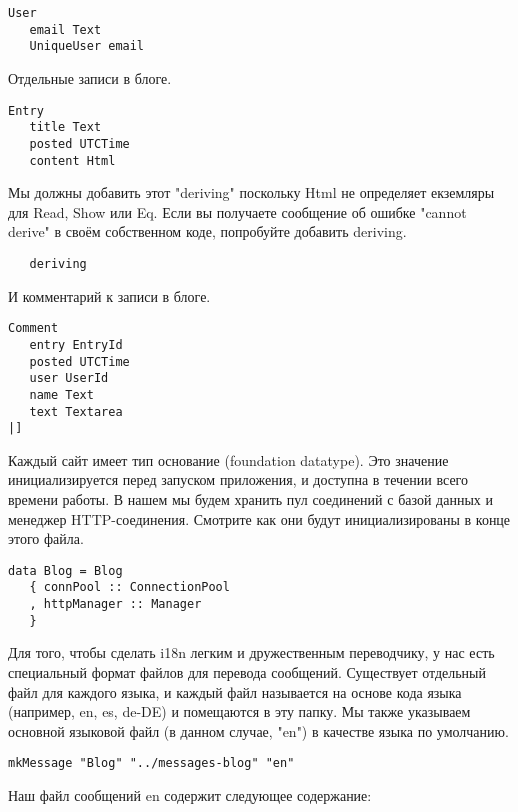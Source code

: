\begin{lstlisting}
User
   email Text
   UniqueUser email
\end{lstlisting}
 
Отдельные записи в блоге. 
 
\begin{lstlisting}
Entry
   title Text
   posted UTCTime
   content Html
\end{lstlisting}
 
Мы должны добавить этот "deriving" поскольку Html не определяет екземляры для Read, Show или Eq. Если вы получаете сообщение об ошибке "cannot derive" в своём собственном коде, попробуйте добавить deriving.
 
\begin{lstlisting}
   deriving
\end{lstlisting}
 
И комментарий к записи в блоге. 
 
\begin{lstlisting}
Comment
   entry EntryId
   posted UTCTime
   user UserId
   name Text
   text Textarea
|]
\end{lstlisting}
 
Каждый сайт имеет тип основание (foundation datatype). Это значение инициализируется перед запуском приложения, и доступна в течении всего времени работы. В нашем мы будем хранить пул соединений с базой данных и менеджер HTTP-соединения. Смотрите как они будут инициализированы в конце этого файла.
 
\begin{lstlisting}
data Blog = Blog
   { connPool :: ConnectionPool
   , httpManager :: Manager
   }
\end{lstlisting}
 
Для того, чтобы сделать i18n легким и дружественным переводчику, у нас есть специальный формат файлов для перевода сообщений. Существует отдельный файл для каждого языка, и каждый файл называется на основе кода языка (например, en, es, de-DE) и помещаются в эту папку. Мы также указываем основной языковой файл (в данном случае, "en") в качестве языка по умолчанию.
 
\begin{lstlisting}
mkMessage "Blog" "../messages-blog" "en"
\end{lstlisting}
 
Наш файл сообщений en содержит следующее содержание: 

